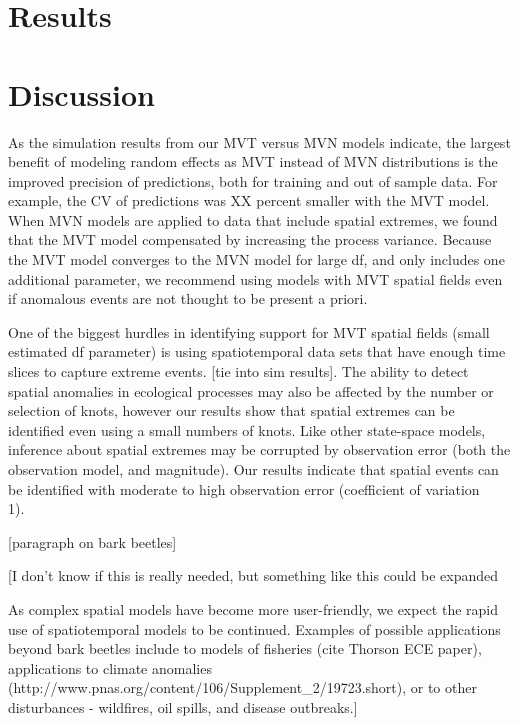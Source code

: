 \documentclass[12pt,english]{article}
\begin{document}
\begin{spacing}{1.25}

\section{Results}

\section{Discussion}

As the simulation results from our MVT versus MVN models indicate, the largest
benefit of modeling random effects as MVT instead of MVN distributions is the
improved precision of predictions, both for training and out of sample data.
For example, the CV of predictions was XX percent smaller with the MVT model.
When MVN models are applied to data that include spatial extremes, we found that
the MVT model compensated by increasing the process variance. Because the MVT model
converges to the MVN model for large df, and only includes one additional parameter,
we recommend using models with MVT spatial fields even if anomalous events are not
thought to be present a priori.

One of the biggest hurdles in identifying support for MVT spatial fields (small estimated
df parameter) is using spatiotemporal data sets that have enough time slices to capture
extreme events. [tie into sim results]. The ability to detect spatial anomalies in ecological 
processes may also be affected by the number or selection of knots, however our results
show that spatial extremes can be identified even using a small numbers of knots. Like other
state-space models, inference about spatial extremes may be corrupted by observation 
error (both the observation model, and magnitude). Our results indicate that spatial events
can be identified with moderate to high observation error (coefficient of variation ~ 1). 

[paragraph on bark beetles]

[I don't know if this is really needed, but something like this could be expanded

As complex spatial models have become more user-friendly, we expect the rapid use
of spatiotemporal models to be continued. Examples of possible applications beyond
bark beetles include to models of fisheries (cite Thorson ECE paper), applications
to climate anomalies (http://www.pnas.org/content/106/Supplement_2/19723.short),
or to other disturbances - wildfires, oil spills, and disease outbreaks.]


\end{spacing}
\end{document}
